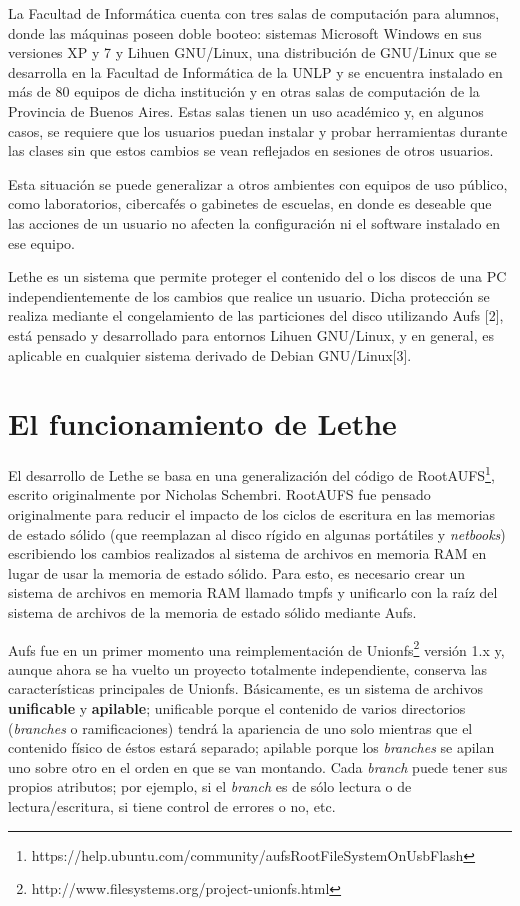 \documentclass[final,narroweqnarray,inline,twoside]{ieee}
\newcommand{\itref}[1]{[{#1}]}
\begin{document}
La Facultad de Informática cuenta con tres salas de computación para alumnos, donde las máquinas poseen doble booteo:
sistemas Microsoft Windows en sus versiones XP y 7 y Lihuen GNU/Linux, una distribución de GNU/Linux que se desarrolla en la
Facultad de Informática de la UNLP y se encuentra instalado en más de 80 equipos de dicha institución y en otras salas de
computación de la Provincia de Buenos Aires. Estas salas tienen un uso académico y, en algunos casos, se requiere que los
usuarios puedan instalar y probar herramientas durante las clases sin que estos cambios se vean reflejados en sesiones de
otros usuarios.

Esta situación se puede generalizar a otros ambientes con equipos de uso público, como laboratorios, cibercafés o gabinetes
de escuelas, en donde es deseable que las acciones de un usuario no afecten la configuración ni el software instalado en ese
equipo.

Lethe es un sistema que permite proteger el contenido del o los discos de una PC independientemente de los cambios que
realice un usuario. Dicha protección se realiza mediante el congelamiento de las particiones del disco utilizando
Aufs \itref{2}, está pensado y desarrollado para entornos Lihuen GNU/Linux, y en general, es aplicable en cualquier
sistema derivado de Debian GNU/Linux\itref{3}.

\section{El funcionamiento de Lethe}
El desarrollo de Lethe se basa en una generalización del código de RootAUFS\footnote
{https://help.ubuntu.com/community/aufsRootFileSystemOnUsbFlash}, escrito originalmente por Nicholas Schembri. RootAUFS fue
pensado originalmente para reducir el impacto de los ciclos de escritura en las memorias de estado sólido (que reemplazan al
disco rígido en algunas portátiles y \textit{netbooks}) escribiendo los cambios realizados al sistema de archivos en memoria
RAM en lugar de usar la memoria de estado sólido. Para esto, es necesario crear un sistema de archivos en memoria RAM llamado
tmpfs y unificarlo con la raíz del sistema de archivos de la memoria de estado sólido mediante
Aufs.

Aufs fue en un primer momento una reimplementación de Unionfs\footnote{http://www.filesystems.org/project-unionfs.html}
versión 1.x y, aunque ahora se ha vuelto un proyecto totalmente independiente, conserva las características principales de
Unionfs. Básicamente, es un sistema de archivos \textbf{unificable} y \textbf{apilable}; unificable porque el contenido de
varios directorios (\textit{branches} o ramificaciones) tendrá la apariencia de uno solo mientras que el contenido físico de
éstos estará separado; apilable porque los \textit{branches} se apilan uno sobre otro en el orden en que se van montando.
Cada \textit{branch} puede tener sus propios atributos; por ejemplo, si el \textit{branch} es de sólo lectura o de
lectura/escritura, si tiene control de errores o no, etc.
\end{document}
